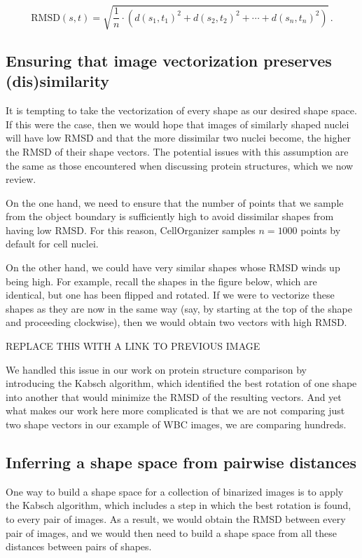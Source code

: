 $$\text{RMSD}(s, t) = \sqrt{\dfrac{1}{n} \cdot (d(s_1, t_1)^2 + d(s_2, t_2)^2 + \cdots + d(s_n, t_n)^2)}\,. $$

\FloatBarrier
{}
\subsection{Ensuring that image vectorization preserves (dis)similarity}

It is tempting to take the vectorization of every shape as our desired shape space. If this were the case, then we would hope that images of similarly shaped nuclei will have low RMSD and that the more dissimilar two nuclei become, the higher the RMSD of their shape vectors. The potential issues with this assumption are the same as those encountered when discussing protein structures, which we now review.

On the one hand, we need to ensure that the number of points that we sample from the object boundary is sufficiently high to avoid dissimilar shapes from having low RMSD. For this reason, CellOrganizer samples $n = 1000$ points by default for cell nuclei.

On the other hand, we could have very similar shapes whose RMSD winds up being high. For example, recall the shapes in the figure below, which are identical, but one has been flipped and rotated. If we were to vectorize these shapes as they are now in the same way (say, by starting at the top of the shape and proceeding clockwise), then we would obtain two vectors with high RMSD.

REPLACE THIS WITH A LINK TO PREVIOUS IMAGE

We handled this issue in our work on protein structure comparison by introducing the Kabsch algorithm, which identified the best rotation of one shape into another that would minimize the RMSD of the resulting vectors. And yet what makes our work here more complicated is that we are not comparing just two shape vectors in our example of WBC images, we are comparing hundreds.

\FloatBarrier
{}
\subsection{Inferring a shape space from pairwise distances}

One way to build a shape space for a collection of binarized images is to apply the Kabsch algorithm, which includes a step in which the best rotation is found, to every pair of images. As a result, we would obtain the RMSD between every pair of images, and we would then need to build a shape space from all these distances between pairs of shapes.\\

